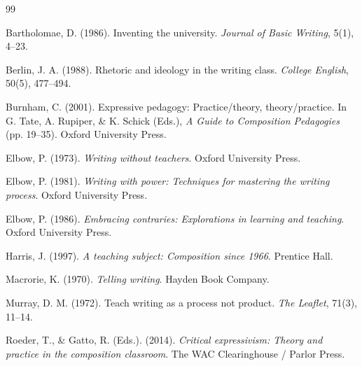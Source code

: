 \documentclass[12pt]{article}
\begin{document}
\begin{thebibliography}{99}

 Bartholomae, D. (1986). Inventing the university. \textit{Journal of Basic Writing}, 5(1), 4--23.

 Berlin, J. A. (1988). Rhetoric and ideology in the writing class. \textit{College English}, 50(5), 477--494.

 Burnham, C. (2001). Expressive pedagogy: Practice/theory, theory/practice. In G. Tate, A. Rupiper, \& K. Schick (Eds.), \textit{A Guide to Composition Pedagogies} (pp. 19--35). Oxford University Press.

 Elbow, P. (1973). \textit{Writing without teachers}. Oxford University Press.

 Elbow, P. (1981). \textit{Writing with power: Techniques for mastering the writing process}. Oxford University Press.

 Elbow, P. (1986). \textit{Embracing contraries: Explorations in learning and teaching}. Oxford University Press.

 Harris, J. (1997). \textit{A teaching subject: Composition since 1966}. Prentice Hall.

 Macrorie, K. (1970). \textit{Telling writing}. Hayden Book Company.

 Murray, D. M. (1972). Teach writing as a process not product. \textit{The Leaflet}, 71(3), 11--14.

 Roeder, T., \& Gatto, R. (Eds.). (2014). \textit{Critical expressivism: Theory and practice in the composition classroom}. The WAC Clearinghouse / Parlor Press.

\end{thebibliography}
\end{document}
